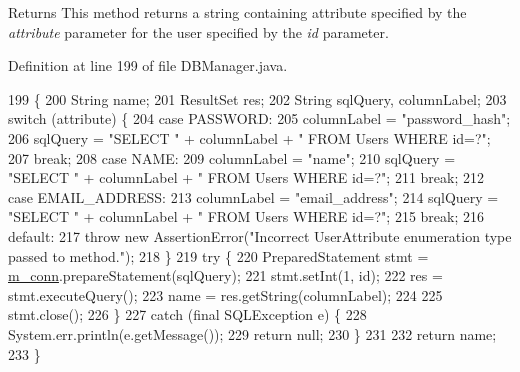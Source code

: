 \begin{DoxyReturn}{Returns}
This method returns a string containing attribute specified by the {\itshape attribute} parameter for the user specified by the {\itshape id} parameter. 
\end{DoxyReturn}


Definition at line 199 of file D\+B\+Manager.\+java.


\begin{DoxyCode}
199                                                                                       \{
200         String name;
201         ResultSet res;
202         String sqlQuery, columnLabel;
203         \textcolor{keywordflow}{switch} (attribute) \{
204             \textcolor{keywordflow}{case} PASSWORD:
205                 columnLabel = \textcolor{stringliteral}{"password\_hash"};
206                 sqlQuery = \textcolor{stringliteral}{"SELECT "} + columnLabel + \textcolor{stringliteral}{" FROM Users WHERE id=?"};
207                 \textcolor{keywordflow}{break};
208             \textcolor{keywordflow}{case} NAME:
209                 columnLabel = \textcolor{stringliteral}{"name"};
210                 sqlQuery = \textcolor{stringliteral}{"SELECT "} + columnLabel + \textcolor{stringliteral}{" FROM Users WHERE id=?"};
211                 \textcolor{keywordflow}{break};
212             \textcolor{keywordflow}{case} EMAIL\_ADDRESS:
213                 columnLabel = \textcolor{stringliteral}{"email\_address"};
214                 sqlQuery = \textcolor{stringliteral}{"SELECT "} + columnLabel + \textcolor{stringliteral}{" FROM Users WHERE id=?"};
215                 \textcolor{keywordflow}{break};
216             \textcolor{keywordflow}{default}:
217                 \textcolor{keywordflow}{throw} \textcolor{keyword}{new} AssertionError(\textcolor{stringliteral}{"Incorrect UserAttribute enumeration type passed to method."});
218         \}
219         \textcolor{keywordflow}{try} \{
220             PreparedStatement stmt = \mbox{\hyperlink{classcom_1_1activitytracker_1_1_d_b_manager_a064088d13ac09eb147fdc19268771521}{m\_conn}}.prepareStatement(sqlQuery);
221             stmt.setInt(1, \textcolor{keywordtype}{id});
222             res = stmt.executeQuery();
223             name = res.getString(columnLabel);
224 
225             stmt.close();
226         \}
227         \textcolor{keywordflow}{catch} (\textcolor{keyword}{final} SQLException e) \{
228             System.err.println(e.getMessage());
229             \textcolor{keywordflow}{return} null;
230         \}
231 
232         \textcolor{keywordflow}{return} name;
233     \}
\end{DoxyCode}
\mbox{\label{classcom_1_1activitytracker_1_1_d_b_manager_a41df4600bb5901a26a4ea6a7108a70b9}} 
